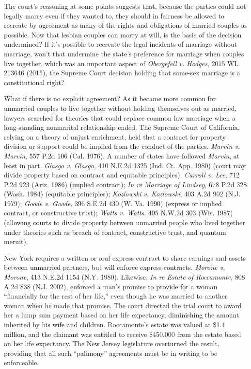 
\item
The court's reasoning at some points suggests that, because the parties could
not legally marry even if they wanted to, they should in fairness be allowed to
recreate by agreement as many of the rights and obligations of married couples
as possible. Now that lesbian couples can marry at will, is the basis of the
decision undermined? If it's possible to recreate the legal incidents of
marriage without marriage, won't that undermine the state's preference for
marriage when couples live together, which was an important aspect of
\emph{Obergefell v. Hodges}, 2015 WL 213646 (2015), the Supreme Court decision
holding that same-sex marriage is a constitutional right?

\item What if there is no explicit agreement? As it became more common for
unmarried couples to live together without holding themselves out as married,
lawyers searched for theories that could replace common law marriage when a
long-standing nonmarital relationship ended. The Supreme Court of California,
relying on a theory of unjust enrichment, held that a contract for property
division or support could be implied from the conduct of the parties.
\emph{Marvin v. Marvin}, 557 P.2d 106 (Cal. 1976). A number of states have
followed \textit{Marvin}, at least in part. \emph{Glasgo v. Glasgo}, 410 N.E.2d
1325 (Ind. Ct. App. 1980) (court may divide property based on contract and
equitable principles); \emph{Carroll v. Lee}, 712 P.2d 923 (Ariz. 1986) (implied
contract); \emph{In re Marriage of Lindsey}, 678 P.2d 328 (Wash. 1984)
(equitable principles); \emph{Kozlowski v. Kozlowski}, 403 A.2d 902 (N.J. 1979);
\emph{Goode v. Goode}, 396 S.E.2d 430 (W. Va. 1990) (express or implied
contract, or constructive trust); \emph{Watts v. Watts}, 405 N.W.2d 303 (Wis.
1987) (allowing courts to divide property between unmarried people who lived
together under theories such as breach of contract, constructive trust, and
quantum meruit).

\item
New York requires a written or oral express contract to share earnings and
assets between unmarried partners, but will enforce express contracts.
\emph{Morone v. Morone}, 413 N.E.2d 1154 (N.Y. 1980). Likewise, \emph{In re
Estate of Roccamonte},
808 A.2d 838 (N.J. 2002), enforced a man's promise to provide for a woman
``financially for the rest of her life,'' even though he was married to another
woman when he made that promise. The court directed the trial court to award
her a lump sum payment based on her life expectancy, diminishing the amount
inherited by his wife and children. Roccamonte's estate was valued at \$1.4
million, and the claimant was entitled to receive \$450,000 from the estate
based on her life expectancy. The New Jersey legislature overturned the
result, providing that all such ``palimony'' agreements must be in writing to
be enforceable.


